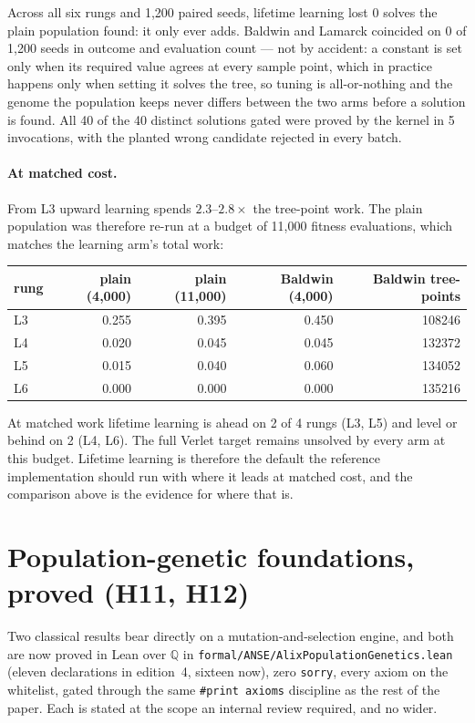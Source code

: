 \documentclass[11pt,a4paper]{article}
\theoremstyle{definition}
\theoremstyle{remark}
\begin{document}
Across all six rungs and 1{,}200 paired seeds, lifetime learning lost 0 solves the plain population found: it only ever adds. Baldwin and Lamarck coincided on 0 of 1{,}200 seeds in outcome and evaluation count --- not by accident: a constant is set only when its required value agrees at every sample point, which in practice happens only when setting it solves the tree, so tuning is all-or-nothing and the genome the population keeps never differs between the two arms before a solution is found. All 40 of the 40 distinct solutions gated were proved by the kernel in 5 invocations, with the planted wrong candidate rejected in every batch.

\paragraph{At matched cost.} From L3 upward learning spends $2.3$--$2.8\times$ the tree-point work. The plain population was therefore re-run at a budget of 11,000 fitness evaluations, which matches the learning arm's total work:

\begin{center}
\begin{tabular}{lrrrr}
\toprule
rung & plain (4{,}000) & plain (11,000) & Baldwin (4{,}000) & Baldwin tree-points \\
\midrule
L3 & 0.255 & 0.395 & 0.450 & 108246 \\
L4 & 0.020 & 0.045 & 0.045 & 132372 \\
L5 & 0.015 & 0.040 & 0.060 & 134052 \\
L6 & 0.000 & 0.000 & 0.000 & 135216 \\
\bottomrule
\end{tabular}
\end{center}

At matched work lifetime learning is ahead on 2 of 4 rungs (L3, L5) and level or behind on 2 (L4, L6). The full Verlet target remains unsolved by every arm at this budget. Lifetime learning is therefore the default the reference implementation should run with where it leads at matched cost, and the comparison above is the evidence for where that is.

\section{Population-genetic foundations, proved (H11, H12)}\label{sec:popgen}

Two classical results bear directly on a mutation-and-selection engine, and both
are now proved in Lean over $\mathbb{Q}$ in
\texttt{formal/ANSE/AlixPopulationGenetics.lean} (eleven declarations in edition~4, sixteen now), zero
\texttt{sorry}, every axiom on the whitelist, gated through the same
\texttt{\#print axioms} discipline as the rest of the paper. Each is stated at the
scope an internal review required, and no wider.
\end{document}
